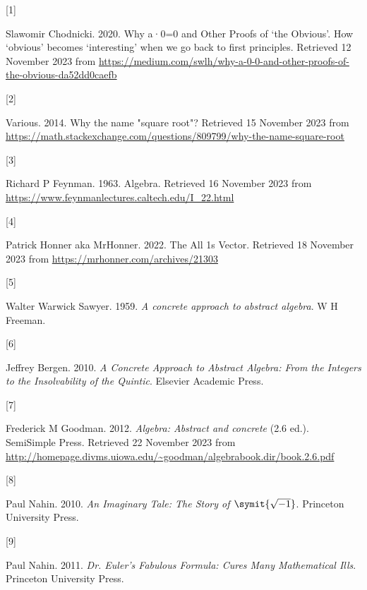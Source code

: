 \documentclass[
  a4paper,
]{article}
\newlength{\cslhangindent}
\newlength{\csllabelwidth}
\newlength{\cslentryspacingunit} %
\newenvironment{CSLReferences}[2] %
 {%
  \setlength{\parindent}{0pt}
  \ifodd #1
  \let\oldpar\par
  \def\par{\hangindent=\cslhangindent\oldpar}
  \fi
  \setlength{\parskip}{#2\cslentryspacingunit}
 }%
 {}
\newcommand{\CSLLeftMargin}[1]{\parbox[t]{\csllabelwidth}{#1}}
\newcommand{\CSLRightInline}[1]{\parbox[t]{\linewidth - \csllabelwidth}{#1}\break}
\begin{document}
\hypertarget{refs}{}
\begin{CSLReferences}{0}{0}
\leavevmode{}%
\CSLLeftMargin{{[}1{]} }%
\CSLRightInline{Slawomir Chodnicki. 2020. {Why a·0=0 and Other Proofs of
{`the Obvious'}}. {How {`obvious'} becomes {`interesting'} when we go
back to first principles}. Retrieved 12 November 2023 from
\url{https://medium.com/swlh/why-a-0-0-and-other-proofs-of-the-obvious-da52dd0caefb}}

\leavevmode{}%
\CSLLeftMargin{{[}2{]} }%
\CSLRightInline{Various. 2014. {Why the name "square root"?} Retrieved
15 November 2023 from
\url{https://math.stackexchange.com/questions/809799/why-the-name-square-root}}

\leavevmode{}%
\CSLLeftMargin{{[}3{]} }%
\CSLRightInline{Richard P Feynman. 1963. Algebra. Retrieved 16 November
2023 from \url{https://www.feynmanlectures.caltech.edu/I_22.html}}

\leavevmode{}%
\CSLLeftMargin{{[}4{]} }%
\CSLRightInline{Patrick Honner aka MrHonner. 2022. {The All 1s Vector}.
Retrieved 18 November 2023 from
\url{https://mrhonner.com/archives/21303}}

\leavevmode{}%
\CSLLeftMargin{{[}5{]} }%
\CSLRightInline{Walter Warwick Sawyer. 1959. \emph{A concrete approach
to abstract algebra}. W H Freeman.}

\leavevmode{}%
\CSLLeftMargin{{[}6{]} }%
\CSLRightInline{Jeffrey Bergen. 2010. \emph{{A Concrete Approach to
Abstract Algebra}: {From the Integers to the Insolvability of the
Quintic}}. Elsevier Academic Press.}

\leavevmode{}%
\CSLLeftMargin{{[}7{]} }%
\CSLRightInline{Frederick M Goodman. 2012. \emph{Algebra: Abstract and
concrete} (2.6 ed.). SemiSimple Press. Retrieved 22 November 2023 from
\url{http://homepage.divms.uiowa.edu/~goodman/algebrabook.dir/book.2.6.pdf}}

\leavevmode{}%
\CSLLeftMargin{{[}8{]} }%
\CSLRightInline{Paul Nahin. 2010. \emph{{An Imaginary Tale: The Story of
\(\symit{\sqrt{-1}}\)}}. Princeton University Press.}

\leavevmode{}%
\CSLLeftMargin{{[}9{]} }%
\CSLRightInline{Paul Nahin. 2011. \emph{{Dr. Euler's Fabulous Formula:
Cures Many Mathematical Ills}}. Princeton University Press.}


\end{CSLReferences}
\end{document}
